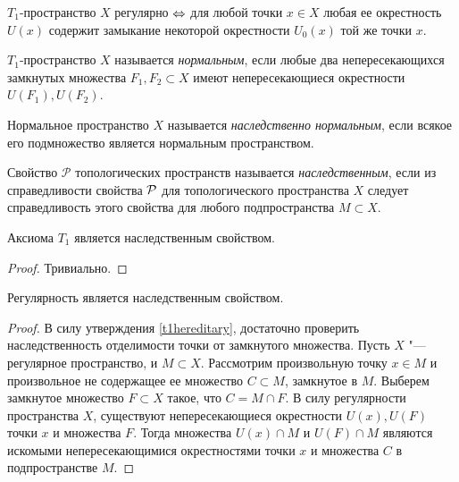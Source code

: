 \begin{theorem}\label{theoremreg}
    $T_1$-пространство $X$ регулярно $\Leftrightarrow$ для любой точки $x \in X$ любая ее окрестность $U(x)$ содержит замыкание некоторой окрестности $U_0(x)$ той же точки
    $x$.
\end{theorem}

\begin{definition}
    $T_1$-пространство $X$ называется \textit{нормальным}, если любые два непересекающихся замкнутых множества $F_1, F_2 \subset X$ имеют непересекающиеся окрестности $U(F_1), U(F_2)$.
\end{definition}

\begin{definition}
    Нормальное пространство $X$ называется \textit{наследственно нормальным}, если всякое его подмножество является нормальным пространством.
\end{definition}

\begin{definition}
    Свойство $\mathcal{P}$ топологических пространств называется \textit{наследственным}, если из справедливости свойства $\mathcal P$ для топологического пространства $X$ следует справедливость этого свойства для любого подпространства $M \subset X$.
\end{definition}

\begin{proposition}\label{t1hereditary}
    Аксиома $T_1$ является наследственным свойством.
\end{proposition}

\begin{proof}
    Тривиально.
\end{proof}

\begin{proposition}
    Регулярность является наследственным свойством.
\end{proposition}

\begin{proof}
    В силу утверждения \ref{t1hereditary}, достаточно проверить наследственность отделимости точки от замкнутого множества. Пусть $X$ "--- регулярное пространство, и  $M\subset X$. Рассмотрим произвольную точку $x \in M$ и произвольное не содержащее ее множество $C \subset M$, замкнутое в $M$. Выберем замкнутое множество $F \subset X$ такое, что $C = M \cap F$. В силу регулярности пространства $X$, существуют непересекающиеся окрестности $U(x), U(F)$ точки $x$ и множества $F$. Тогда множества $U(x)\cap M$ и $U(F)\cap M$ являются искомыми непересекающимися окрестностями точки $x$ и множества $C$ в подпространстве $M$.
\end{proof}

